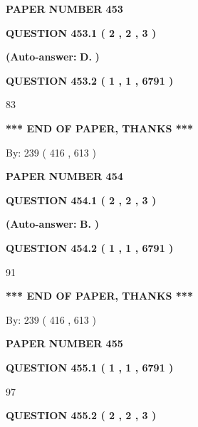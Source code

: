 \documentclass{ctexart}
\begin{document}
   
\newpage 
\setcounter{page}{ 
   453001 } 
   
   
 {\textbf{ \Large{ PAPER NUMBER  453  }}}
   
   
   
   
  
  
{\textbf{\large{QUESTION
453.1 
 ( 2 , 2 , 3 )
}}}
 
 
{\textbf{(Auto-answer:}}
{\textbf{\large{
D.}}}
{\textbf{)}}
 
 
  
  
{\textbf{\large{QUESTION
453.2 
 ( 1 , 1 , 6791 )
}}}

83
   
   
   
   
\vspace{1.0in} 
{\textbf{\large{ *** END OF PAPER, THANKS *** }}} 
   
   
\hspace{1.0in} By: 
 239 ( 416 ,  613 )
   
   
   
   
\newpage 
\setcounter{page}{ 
   454001 } 
   
   
 {\textbf{ \Large{ PAPER NUMBER  454  }}}
   
   
   
   
  
  
{\textbf{\large{QUESTION
454.1 
 ( 2 , 2 , 3 )
}}}
 
 
{\textbf{(Auto-answer:}}
{\textbf{\large{
B.}}}
{\textbf{)}}
 
 
  
  
{\textbf{\large{QUESTION
454.2 
 ( 1 , 1 , 6791 )
}}}

91
   
   
   
   
\vspace{1.0in} 
{\textbf{\large{ *** END OF PAPER, THANKS *** }}} 
   
   
\hspace{1.0in} By: 
 239 ( 416 ,  613 )
   
   
   
   
\newpage 
\setcounter{page}{ 
   455001 } 
   
   
 {\textbf{ \Large{ PAPER NUMBER  455  }}}
   
   
   
   
  
  
{\textbf{\large{QUESTION
455.1 
 ( 1 , 1 , 6791 )
}}}

97
  
  
{\textbf{\large{QUESTION
455.2 
 ( 2 , 2 , 3 )
}}}
 
\end{document}
